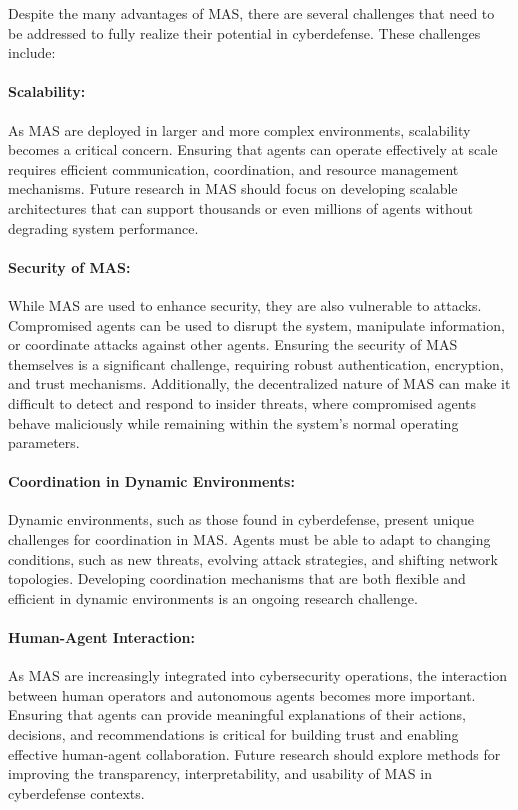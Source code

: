 Despite the many advantages of MAS, there are several challenges that need to be addressed to fully realize their potential in cyberdefense. These challenges include:

\paragraph{Scalability:}
As MAS are deployed in larger and more complex environments, scalability becomes a critical concern. Ensuring that agents can operate effectively at scale requires efficient communication, coordination, and resource management mechanisms. Future research in MAS should focus on developing scalable architectures that can support thousands or even millions of agents without degrading system performance.

\paragraph{Security of MAS:}
While MAS are used to enhance security, they are also vulnerable to attacks. Compromised agents can be used to disrupt the system, manipulate information, or coordinate attacks against other agents. Ensuring the security of MAS themselves is a significant challenge, requiring robust authentication, encryption, and trust mechanisms. Additionally, the decentralized nature of MAS can make it difficult to detect and respond to insider threats, where compromised agents behave maliciously while remaining within the system's normal operating parameters.

\paragraph{Coordination in Dynamic Environments:}
Dynamic environments, such as those found in cyberdefense, present unique challenges for coordination in MAS. Agents must be able to adapt to changing conditions, such as new threats, evolving attack strategies, and shifting network topologies. Developing coordination mechanisms that are both flexible and efficient in dynamic environments is an ongoing research challenge.

\paragraph{Human-Agent Interaction:}
As MAS are increasingly integrated into cybersecurity operations, the interaction between human operators and autonomous agents becomes more important. Ensuring that agents can provide meaningful explanations of their actions, decisions, and recommendations is critical for building trust and enabling effective human-agent collaboration. Future research should explore methods for improving the transparency, interpretability, and usability of MAS in cyberdefense contexts.



